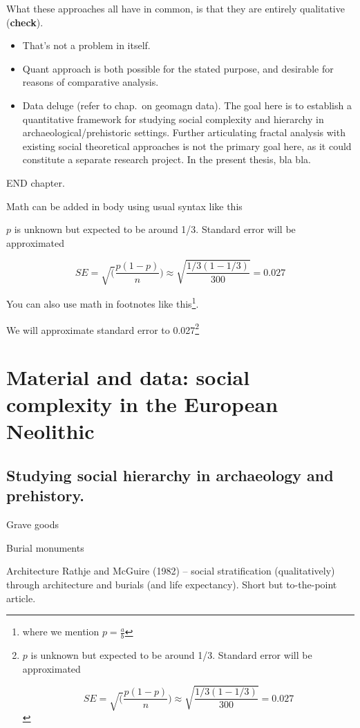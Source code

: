 \documentclass[
  12pt,
]{book}
\begin{document}
What these approaches all have in common, is that they are entirely qualitative (\textbf{check}).

\begin{itemize}
\item
  That's not a problem in itself.
\item
  Quant approach is both possible for the stated purpose, and desirable for reasons of comparative analysis.
\item
  Data deluge (refer to chap.~on geomagn data). The goal here is to establish a quantitative framework for studying social complexity and hierarchy in archaeological/prehistoric settings. Further articulating fractal analysis with existing social theoretical approaches is not the primary goal here, as it could constitute a separate research project. In the present thesis, bla bla.
\end{itemize}

END chapter.

Math can be added in body using usual syntax like this

\(p\) is unknown but expected to be around 1/3. Standard error will be approximated

\[
SE = \sqrt(\frac{p(1-p)}{n}) \approx \sqrt{\frac{1/3 (1 - 1/3)} {300}} = 0.027
\]

You can also use math in footnotes like this\footnote{where we mention \(p = \frac{a}{b}\)}.

We will approximate standard error to 0.027\footnote{\(p\) is unknown but expected to be around 1/3. Standard error will be approximated

  \[
  SE = \sqrt(\frac{p(1-p)}{n}) \approx \sqrt{\frac{1/3 (1 - 1/3)} {300}} = 0.027
  \]}

\hypertarget{material}{%
\chapter{Material and data: social complexity in the European Neolithic}\label{material}}

\hypertarget{complexity-archaeo}{%
\section{Studying social hierarchy in archaeology and prehistory.}\label{complexity-archaeo}}

Grave goods

Burial monuments

Architecture Rathje and McGuire (1982) -- social stratification (qualitatively) through architecture and burials (and life expectancy). Short but to-the-point article.
\end{document}
